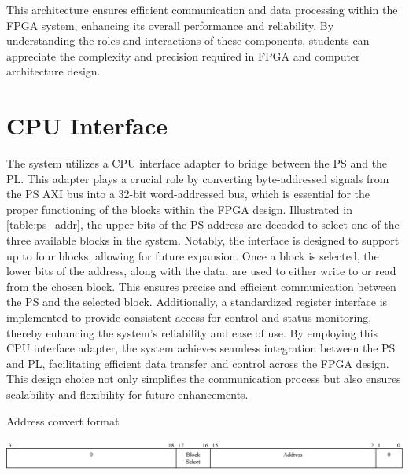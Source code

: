 This architecture ensures efficient communication and data processing within the FPGA system, enhancing its overall performance and reliability. By understanding the roles and interactions of these components, students can appreciate the complexity and precision required in FPGA and computer architecture design.

\section{CPU Interface}

The system utilizes a CPU interface adapter to bridge between the PS and the PL. This adapter plays a crucial role by converting byte-addressed signals from the PS AXI bus into a 32-bit word-addressed bus, which is essential for the proper functioning of the blocks within the FPGA design. Illustrated in \autoref{table:ps_addr}, the upper bits of the PS address are decoded to select one of the three available blocks in the system. Notably, the interface is designed to support up to four blocks, allowing for future expansion. Once a block is selected, the lower bits of the address, along with the data, are used to either write to or read from the chosen block. This ensures precise and efficient communication between the PS and the selected block. Additionally, a standardized register interface is implemented to provide consistent access for control and status monitoring, thereby enhancing the system's reliability and ease of use. By employing this CPU interface adapter, the system achieves seamless integration between the PS and PL, facilitating efficient data transfer and control across the FPGA design. This design choice not only simplifies the communication process but also ensures scalability and flexibility for future enhancements.

 
\begin{table}
\centering
\caption{Address convert format}
\includegraphics[width=1.0\textwidth]{figures/pc_address.png}
\label{table:ps_addr}
\end{table}
